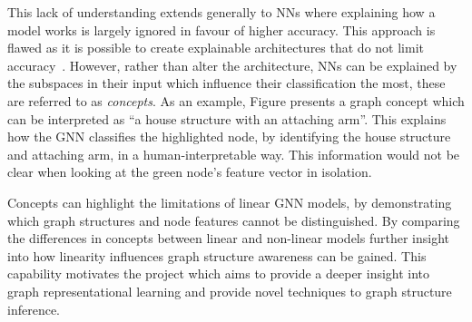 

This lack of understanding extends generally to NNs where explaining how a model works is largely ignored in favour of higher accuracy.
This approach is flawed as it is possible to create explainable architectures that do not limit accuracy~\cite{zarlenga2022concept}.
However, rather than alter the architecture, NNs can be explained by the subspaces in their input which influence their classification the most, these are referred to as \emph{concepts}.
As an example, Figure  presents a graph concept which can be interpreted as ``a house structure with an attaching arm''.
This explains how the GNN classifies the highlighted node, by identifying the house structure and attaching arm, in a human-interpretable way.
This information would not be clear when looking at the green node's feature vector in isolation.

Concepts can highlight the limitations of linear GNN models, by demonstrating which graph structures and node features cannot be distinguished.
By comparing the differences in concepts between linear and non-linear models further insight into how linearity influences graph structure awareness can be gained. 
This capability motivates the project which aims to provide a deeper insight into graph representational learning and provide novel techniques to graph structure inference.

